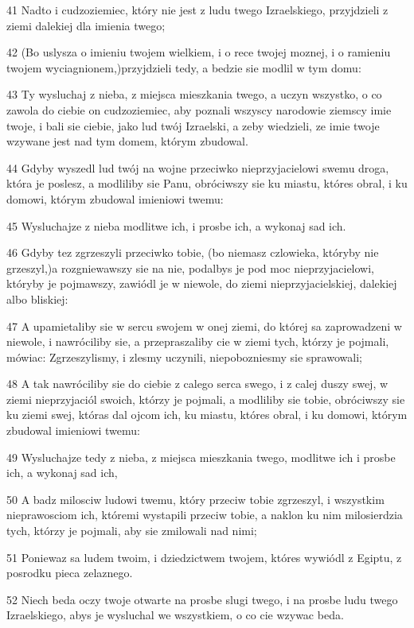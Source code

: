 \par 41 Nadto i cudzoziemiec, który nie jest z ludu twego Izraelskiego, przyjdzieli z ziemi dalekiej dla imienia twego;
\par 42 (Bo uslysza o imieniu twojem wielkiem, i o rece twojej moznej, i o ramieniu twojem wyciagnionem,)przyjdzieli tedy, a bedzie sie modlil w tym domu:
\par 43 Ty wysluchaj z nieba, z miejsca mieszkania twego, a uczyn wszystko, o co zawola do ciebie on cudzoziemiec, aby poznali wszyscy narodowie ziemscy imie twoje, i bali sie ciebie, jako lud twój Izraelski, a zeby wiedzieli, ze imie twoje wzywane jest nad tym domem, którym zbudowal.
\par 44 Gdyby wyszedl lud twój na wojne przeciwko nieprzyjacielowi swemu droga, która je poslesz, a modliliby sie Panu, obróciwszy sie ku miastu, któres obral, i ku domowi, którym zbudowal imieniowi twemu:
\par 45 Wysluchajze z nieba modlitwe ich, i prosbe ich, a wykonaj sad ich.
\par 46 Gdyby tez zgrzeszyli przeciwko tobie, (bo niemasz czlowieka, któryby nie grzeszyl,)a rozgniewawszy sie na nie, podalbys je pod moc nieprzyjacielowi, któryby je pojmawszy, zawiódl je w niewole, do ziemi nieprzyjacielskiej, dalekiej albo bliskiej:
\par 47 A upamietaliby sie w sercu swojem w onej ziemi, do której sa zaprowadzeni w niewole, i nawróciliby sie, a przepraszaliby cie w ziemi tych, którzy je pojmali, mówiac: Zgrzeszylismy, i zlesmy uczynili, niepobozniesmy sie sprawowali;
\par 48 A tak nawróciliby sie do ciebie z calego serca swego, i z calej duszy swej, w ziemi nieprzyjaciól swoich, którzy je pojmali, a modliliby sie tobie, obróciwszy sie ku ziemi swej, któras dal ojcom ich, ku miastu, któres obral, i ku domowi, którym zbudowal imieniowi twemu:
\par 49 Wysluchajze tedy z nieba, z miejsca mieszkania twego, modlitwe ich i prosbe ich, a wykonaj sad ich,
\par 50 A badz milosciw ludowi twemu, który przeciw tobie zgrzeszyl, i wszystkim nieprawosciom ich, któremi wystapili przeciw tobie, a naklon ku nim milosierdzia tych, którzy je pojmali, aby sie zmilowali nad nimi;
\par 51 Poniewaz sa ludem twoim, i dziedzictwem twojem, któres wywiódl z Egiptu, z posrodku pieca zelaznego.
\par 52 Niech beda oczy twoje otwarte na prosbe slugi twego, i na prosbe ludu twego Izraelskiego, abys je wysluchal we wszystkiem, o co cie wzywac beda.
